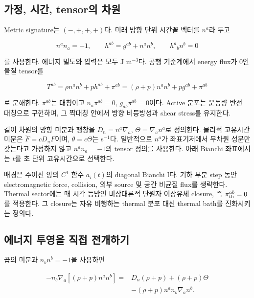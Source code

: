 \documentclass[11pt,a4paper]{article}
\begin{document}
\hypertarget{uxac00uxc815-uxc2dcuxac04-tensoruxc758-uxcc28uxc6d0}{%
\subsection{가정, 시간, tensor의 차원}\label{uxac00uxc815-uxc2dcuxac04-tensoruxc758-uxcc28uxc6d0}}

Metric signature는 \((-,+,+,+)\)다. 미래 방향 단위 시간꼴 벡터를 \(n^a\)라 두고

\[
n^an_a=-1,\qquad
h^{ab}=g^{ab}+n^an^b,\qquad h^a{}_bn^b=0
\]

를 사용한다. 에너지 밀도와 압력은 모두 J m\(^{-3}\)다. 공행 기준계에서 energy flux가 0인 물질 tensor를

\[
T^{ab}=\rho n^an^b+p h^{ab}+\pi^{ab}
=(\rho+p)n^an^b+p g^{ab}+\pi^{ab}
\]

로 분해한다. \(\pi^{ab}\)는 대칭이고 \(n_a\pi^{ab}=0\), \(g_{ab}\pi^{ab}=0\)이다. Active 분포는 운동량 반전 대칭으로 구현하며, 그 짝대칭 안에서 방향 비등방성과 shear stress를 유지한다.

길이 차원의 방향 미분과 팽창을 \(D_n=n^a\nabla_a\), \(\Theta=\nabla_an^a\)로 정의한다. 물리적 고유시간 미분은 \(\dot F=cD_nF\)이며, \(\theta=c\Theta\)는 s\(^{-1}\)다. 일반적으로 \(n^a\)가 좌표기저에서 무차원 성분만 갖는다고 가정하지 않고 \(n^an_a=-1\)의 tensor 정의를 사용한다. 아래 Bianchi 좌표에서는 \(t\)를 초 단위 고유시간으로 선택한다.

배경은 주어진 양의 \(C^1\) 함수 \(a_i(t)\)의 diagonal Bianchi I다. 기하 부분 step 동안 electromagnetic force, collision, 외부 source 및 공간 비균질 flux를 생략한다. Thermal sector에는 매 시각 등방인 비상대론적 단원자 이상유체 closure, 즉 \(\pi_{\rm th}^{ab}=0\)를 적용한다. 그 closure는 자유 비행하는 thermal 분포 대신 thermal bath를 진화시키는 정의다.

\hypertarget{uxc5d0uxb108uxc9c0-uxd22cuxc601uxc744-uxc9c1uxc811-uxc804uxac1cuxd558uxae30}{%
\subsection{에너지 투영을 직접 전개하기}\label{uxc5d0uxb108uxc9c0-uxd22cuxc601uxc744-uxc9c1uxc811-uxc804uxac1cuxd558uxae30}}

곱의 미분과 \(n_bn^b=-1\)을 사용하면

\[
\begin{aligned}
-n_b\nabla_a[(\rho+p)n^an^b]
={}&D_n(\rho+p)+(\rho+p)\Theta\\
 &-(\rho+p)n^an_b\nabla_an^b.
\end{aligned}
\]
\end{document}
